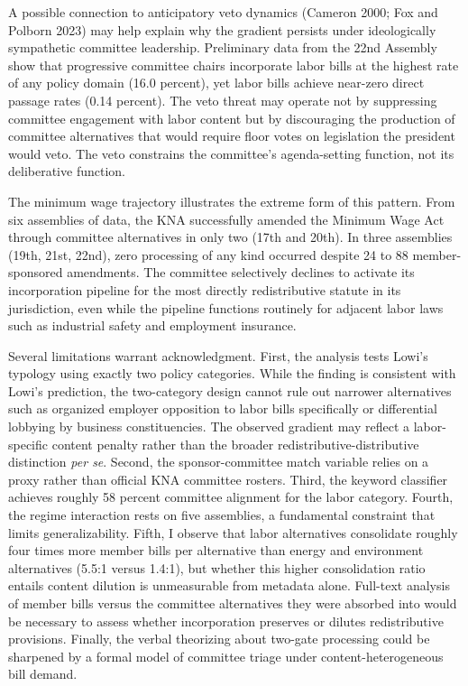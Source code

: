 \documentclass[11pt]{article}
\begin{document}
A possible connection to anticipatory veto dynamics (Cameron 2000; Fox and Polborn 2023) may help explain why the gradient persists under ideologically sympathetic committee leadership. Preliminary data from the 22nd Assembly show that progressive committee chairs incorporate labor bills at the highest rate of any policy domain (16.0 percent), yet labor bills achieve near-zero direct passage rates (0.14 percent). The veto threat may operate not by suppressing committee engagement with labor content but by discouraging the production of committee alternatives that would require floor votes on legislation the president would veto. The veto constrains the committee's agenda-setting function, not its deliberative function.

The minimum wage trajectory illustrates the extreme form of this pattern. From six assemblies of data, the KNA successfully amended the Minimum Wage Act through committee alternatives in only two (17th and 20th). In three assemblies (19th, 21st, 22nd), zero processing of any kind occurred despite 24 to 88 member-sponsored amendments. The committee selectively declines to activate its incorporation pipeline for the most directly redistributive statute in its jurisdiction, even while the pipeline functions routinely for adjacent labor laws such as industrial safety and employment insurance.

Several limitations warrant acknowledgment. First, the analysis tests Lowi's typology using exactly two policy categories. While the finding is consistent with Lowi's prediction, the two-category design cannot rule out narrower alternatives such as organized employer opposition to labor bills specifically or differential lobbying by business constituencies. The observed gradient may reflect a labor-specific content penalty rather than the broader redistributive-distributive distinction \textit{per se}. Second, the sponsor-committee match variable relies on a proxy rather than official KNA committee rosters. Third, the keyword classifier achieves roughly 58 percent committee alignment for the labor category. Fourth, the regime interaction rests on five assemblies, a fundamental constraint that limits generalizability. Fifth, I observe that labor alternatives consolidate roughly four times more member bills per alternative than energy and environment alternatives (5.5:1 versus 1.4:1), but whether this higher consolidation ratio entails content dilution is unmeasurable from metadata alone. Full-text analysis of member bills versus the committee alternatives they were absorbed into would be necessary to assess whether incorporation preserves or dilutes redistributive provisions. Finally, the verbal theorizing about two-gate processing could be sharpened by a formal model of committee triage under content-heterogeneous bill demand.
\end{document}
